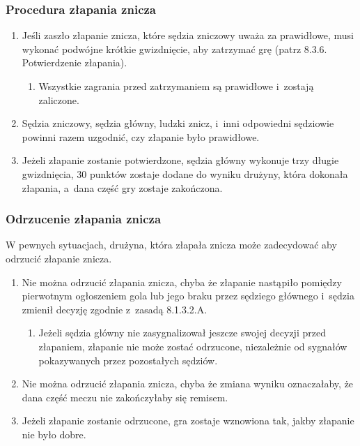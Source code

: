 \documentclass[12pt,a4paper]{article}
\begin{document}
\subsubsection{Procedura złapania znicza}

\begin{enumerate}
	\item
	      Jeśli zaszło złapanie znicza, które sędzia zniczowy uważa za
	      prawidłowe, musi wykonać podwójne krótkie gwizdnięcie, aby zatrzymać
	      grę (patrz 8.3.6. Potwierdzenie złapania).

	      \begin{enumerate}
		      \item
		            Wszystkie zagrania przed zatrzymaniem są prawidłowe i~zostają
		            zaliczone.
	      \end{enumerate}
	\item
	      Sędzia zniczowy, sędzia główny, ludzki znicz, i~inni odpowiedni
	      sędziowie powinni razem uzgodnić, czy złapanie było prawidłowe.
	\item
	      Jeżeli złapanie zostanie potwierdzone, sędzia główny wykonuje trzy
	      długie gwizdnięcia, 30 punktów zostaje dodane do wyniku drużyny, która
	      dokonała złapania, a~dana część gry zostaje zakończona.
\end{enumerate}

\subsubsection{Odrzucenie złapania znicza}

W pewnych sytuacjach, drużyna, która złapała znicza może zadecydować aby
odrzucić złapanie znicza.

\begin{enumerate}
	\item
	      Nie można odrzucić złapania znicza, chyba że złapanie nastąpiło
	      pomiędzy pierwotnym ogłoszeniem gola lub jego braku przez sędziego
	      głównego i~sędzia zmienił decyzję zgodnie z~zasadą 8.1.3.2.A.

	      \begin{enumerate}
		      \item
		            Jeżeli sędzia główny nie zasygnalizował jeszcze swojej decyzji przed
				złapaniem, złapanie nie może zostać odrzucone, niezależnie od sygnałów
				pokazywanych przez pozostałych sędziów.
	      \end{enumerate}
	\item
	      Nie można odrzucić złapania znicza, chyba że zmiana wyniku
	      oznaczałaby, że dana część meczu nie zakończyłaby się remisem.
	\item
	      Jeżeli złapanie zostanie odrzucone, gra zostaje wznowiona tak, jakby
	      złapanie nie było dobre.
\end{enumerate}
\end{document}
